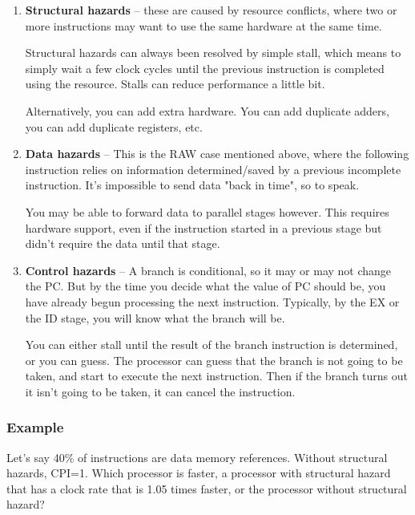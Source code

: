 \documentclass{article}
\begin{document}
\begin{enumerate}

\item \textbf{Structural hazards} -- these are caused by resource conflicts, where two or more instructions may want to use the same hardware at the same time. 

Structural hazards can always been resolved by simple stall, which means to simply wait a few clock cycles until the previous instruction is completed using the resource. Stalls can reduce performance a little bit.

Alternatively, you can add extra hardware. You can add duplicate adders, you can add duplicate registers, etc. 


\item \textbf{Data hazards} -- This is the RAW case mentioned above, where the following instruction relies on information determined/saved by a previous incomplete instruction. It's impossible to send data "back in time", so to speak.

You may be able to forward data to parallel stages however. This requires hardware support, even if the instruction started in a previous stage but didn't require the data until that stage. 

\item \textbf{Control hazards} -- A branch is conditional, so it may or may not change the PC. But by the time you decide what the value of PC should be, you have already begun processing the next instruction. Typically, by the EX or the ID stage, you will know what the branch will be. 

You can either stall until the result of the branch instruction is determined, or you can guess. The processor can guess that the branch is not going to be taken, and start to execute the next instruction. Then if the branch turns out it isn't going to be taken, it can cancel the instruction. 

\end{enumerate}

\subsubsection*{Example}

Let's say 40\% of instructions are data memory references. Without structural hazards, CPI=1. Which processor is faster, a processor with structural hazard that has a clock rate that is 1.05 times faster, or the processor without structural hazard?
\end{document}
